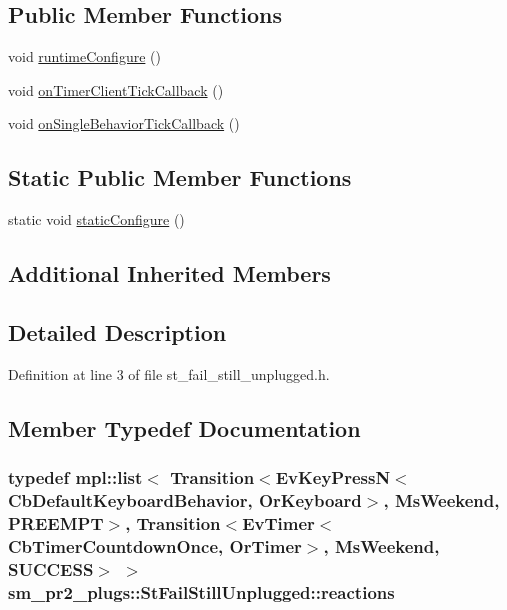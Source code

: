 \subsection*{Public Member Functions}
\begin{DoxyCompactItemize}
\item 
void \hyperlink{structsm__pr2__plugs_1_1StFailStillUnplugged_af8704d60b24ec65be825b5dc416632d1}{runtime\+Configure} ()
\item 
void \hyperlink{structsm__pr2__plugs_1_1StFailStillUnplugged_a9778180fa18c15f2d94c774ebde4c7cf}{on\+Timer\+Client\+Tick\+Callback} ()
\item 
void \hyperlink{structsm__pr2__plugs_1_1StFailStillUnplugged_ac9dc49f0681e4d6a17b30461881b9572}{on\+Single\+Behavior\+Tick\+Callback} ()
\end{DoxyCompactItemize}
\subsection*{Static Public Member Functions}
\begin{DoxyCompactItemize}
\item 
static void \hyperlink{structsm__pr2__plugs_1_1StFailStillUnplugged_a42820633846d0c87f9793a11b484d292}{static\+Configure} ()
\end{DoxyCompactItemize}
\subsection*{Additional Inherited Members}


\subsection{Detailed Description}


Definition at line 3 of file st\+\_\+fail\+\_\+still\+\_\+unplugged.\+h.



\subsection{Member Typedef Documentation}
\subsubsection[{\texorpdfstring{reactions}{reactions}}]{\setlength{\rightskip}{0pt plus 5cm}typedef mpl\+::list$<$ Transition$<$Ev\+Key\+PressN$<$Cb\+Default\+Keyboard\+Behavior, {\bf Or\+Keyboard}$>$, {\bf Ms\+Weekend}, {\bf P\+R\+E\+E\+M\+PT}$>$, Transition$<$Ev\+Timer$<$Cb\+Timer\+Countdown\+Once, {\bf Or\+Timer}$>$, {\bf Ms\+Weekend}, {\bf S\+U\+C\+C\+E\+SS}$>$ $>$ {\bf sm\+\_\+pr2\+\_\+plugs\+::\+St\+Fail\+Still\+Unplugged\+::reactions}}\hypertarget{structsm__pr2__plugs_1_1StFailStillUnplugged_a9c9ae3c078efa50be9683fa32a7bd60e}{}\label{structsm__pr2__plugs_1_1StFailStillUnplugged_a9c9ae3c078efa50be9683fa32a7bd60e}


